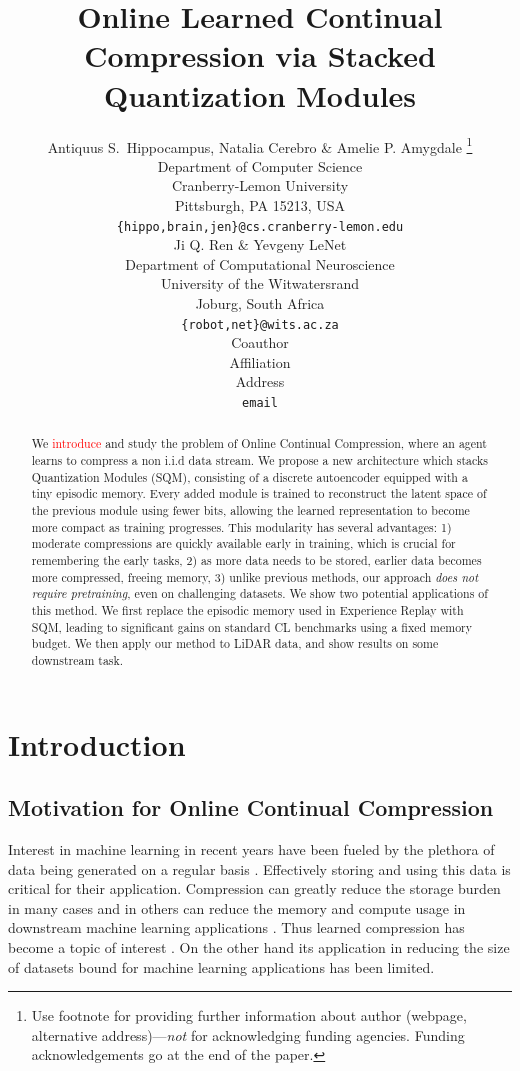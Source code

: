 \documentclass[colorinlistoftodos]{article} %
\title{Online Learned Continual Compression via Stacked Quantization Modules}
\author{Antiquus S.~Hippocampus, Natalia Cerebro \& Amelie P. Amygdale \thanks{ Use footnote for providing further information
about author (webpage, alternative address)---\emph{not} for acknowledging
funding agencies.  Funding acknowledgements go at the end of the paper.} \\
Department of Computer Science\\
Cranberry-Lemon University\\
Pittsburgh, PA 15213, USA \\
\texttt{\{hippo,brain,jen\}@cs.cranberry-lemon.edu} \\
\And
Ji Q. Ren \& Yevgeny LeNet \\
Department of Computational Neuroscience \\
University of the Witwatersrand \\
Joburg, South Africa \\
\texttt{\{robot,net\}@wits.ac.za} \\
\AND
Coauthor \\
Affiliation \\
Address \\
\texttt{email}
}
\newcommand\mynotesEB[1]{\textcolor{red}{#1}}
\begin{document}
\maketitle

\begin{abstract}
We \mynotesEB{introduce} and study the problem of Online Continual Compression, where an agent learns to compress a non i.i.d data stream. We propose a new architecture which stacks Quantization Modules (SQM), consisting of a discrete autoencoder equipped with a tiny episodic memory. Every added module is trained to reconstruct the latent space of the previous module using fewer bits, allowing the learned representation to become more compact as training progresses. This modularity has several advantages: 1) moderate compressions are quickly available early in training, which is crucial for remembering the early tasks, 2) as more data needs to be stored, earlier data becomes more compressed, freeing memory, 3) unlike previous methods, our approach \textit{does not require pretraining}, even on challenging datasets. We show two potential applications of this method. We first replace the episodic memory used in Experience Replay with SQM, leading to significant gains on standard CL benchmarks using a fixed memory budget. We then apply our method to LiDAR data, and show results on some downstream task.

\end{abstract}


\section{Introduction}

\subsection{Motivation for Online Continual Compression}
Interest in machine learning in recent years have been fueled by the plethora of data being generated on a regular basis \cite{}. Effectively storing and using this data is critical for their application. Compression can greatly reduce the storage burden in many cases and in others can reduce the memory and compute usage in downstream machine learning applications \citep{JPEG,Oyallon_2018_ECCV}. Thus learned compression has become a topic of interest \cite{VQVAE,ACN,OneMore}. On the other hand its application in reducing the size of datasets bound for machine learning applications has been limited.
\end{document}
